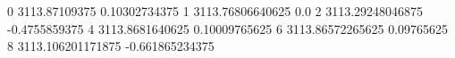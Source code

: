 0 3113.87109375 0.10302734375
1 3113.76806640625 0.0
2 3113.29248046875 -0.4755859375
4 3113.8681640625 0.10009765625
6 3113.86572265625 0.09765625
8 3113.106201171875 -0.661865234375
